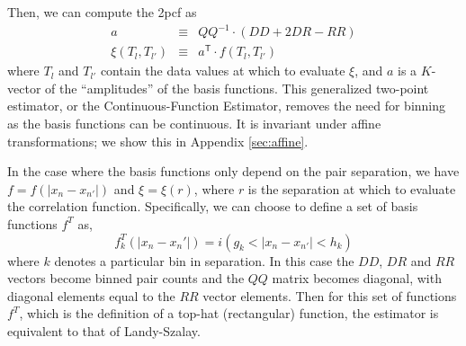 \documentclass[modern]{aastex62}
\newcommand{\cf}{2pcf\xspace} %
\newcommand{\est}{the Continuous-Function Estimator\xspace}
\newcommand{\inv}{^{-1}}
\newcommand{\T}{^{\mathsf{T}}}
\begin{document}
Then, we can compute the \cf as
\begin{eqnarray}\displaystyle
a &\equiv& QQ\inv \cdot (DD + 2DR - RR) \\
\xi(T_l, T_{l'}) &\equiv& a\T \cdot f(T_l, T_{l'}) \label{eq:xi_proj}
\end{eqnarray}
where $T_l$ and $T_{l'}$ contain the data values at which to evaluate $\xi$, and $a$ is a $K$-vector of the ``amplitudes'' of the basis functions.
This generalized two-point estimator, or \est, removes the need for binning as the basis functions can be continuous.
It is invariant under affine transformations; we show this in Appendix \ref{sec:affine}.

%

In the case where the basis functions only depend on the pair separation, we have $f = f(|x_n - x_{n'}|)$ and $\xi = \xi(r)$, where $r$ is the separation at which to evaluate the correlation function.
Specifically, we can choose to define a set of basis functions $f^T$ as,
\begin{equation}
f^T_k(|x_n - x_n'|) =  i(g_k < |x_n - x_{n'}| < h_k)
\end{equation}
where $k$ denotes a particular bin in separation.
In this case the $DD$, $DR$ and $RR$ vectors become binned pair counts and the $QQ$ matrix becomes diagonal, with diagonal elements equal to the $RR$ vector elements. %
Then for this set of functions $f^T$, which is the definition of a top-hat (rectangular) function, the estimator is equivalent to that of Landy-Szalay.
\end{document}
